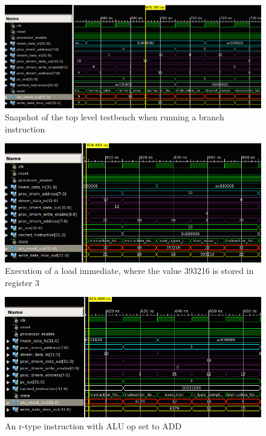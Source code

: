 \begin{figure}[ht!]
    \begin{center}
    \includegraphics[width=\textwidth]{assets/isim/branch_completion_cycle.png}
    \caption{Snapshot of the top level testbench when running a branch instruction}
    \label{fig:branch_completion_cycle}
    \end{center}
\end{figure}

\begin{figure}[ht!]
    \begin{center}
    \includegraphics[width=\textwidth]{assets/isim/load_upper_cycle.png}
    \caption{Execution of a load immediate, where the value 393216 is stored in register 3}
    \label{fig:load_upper_cycle}
    \end{center}
\end{figure}

\begin{figure}[ht!]
    \begin{center}
    \includegraphics[width=\textwidth]{assets/isim/r_type_cycle.png}
    \caption{An r-type instruction with ALU op set to ADD}
    \label{fig:r_type_cycle}
    \end{center}
\end{figure}
